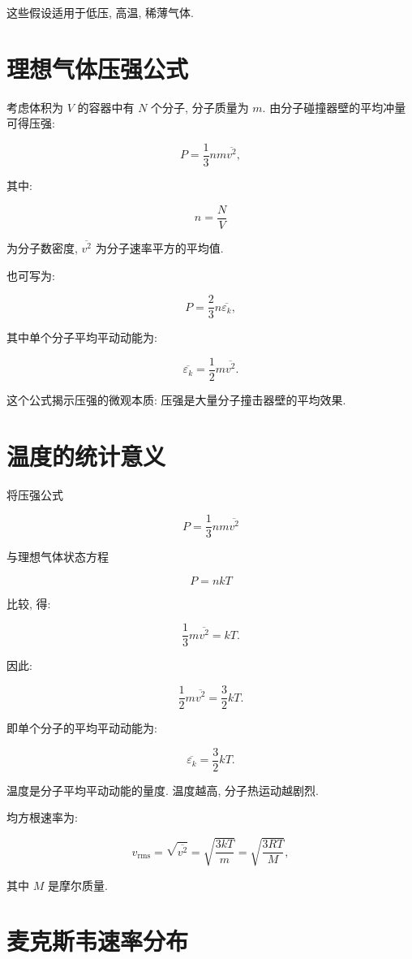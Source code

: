 \documentclass[
  a4paper,
]{ctexrep}
\begin{document}
这些假设适用于低压, 高温, 稀薄气体.

\section{理想气体压强公式}\label{ux7406ux60f3ux6c14ux4f53ux538bux5f3aux516cux5f0f}

考虑体积为 \(V\) 的容器中有 \(N\) 个分子, 分子质量为 \(m\).
由分子碰撞器壁的平均冲量可得压强:

\[
P=\frac{1}{3}nm\overline{v^2},
\]

其中:

\[
n=\frac{N}{V}
\]

为分子数密度, \(\overline{v^2}\) 为分子速率平方的平均值.

也可写为:

\[
P=\frac{2}{3}n\overline{\varepsilon_k},
\]

其中单个分子平均平动动能为:

\[
\overline{\varepsilon_k}=\frac{1}{2}m\overline{v^2}.
\]

这个公式揭示压强的微观本质: 压强是大量分子撞击器壁的平均效果.

\section{温度的统计意义}\label{ux6e29ux5ea6ux7684ux7edfux8ba1ux610fux4e49}

将压强公式

\[
P=\frac{1}{3}nm\overline{v^2}
\]

与理想气体状态方程

\[
P=nkT
\]

比较, 得:

\[
\frac{1}{3}m\overline{v^2}=kT.
\]

因此:

\[
\frac{1}{2}m\overline{v^2}=\frac{3}{2}kT.
\]

即单个分子的平均平动动能为:

\[
\overline{\varepsilon_k}=\frac{3}{2}kT.
\]

温度是分子平均平动动能的量度. 温度越高, 分子热运动越剧烈.

均方根速率为:

\[
v_{\mathrm{rms}}=\sqrt{\overline{v^2}}=\sqrt{\frac{3kT}{m}}=\sqrt{\frac{3RT}{M}},
\]

其中 \(M\) 是摩尔质量.

\section{麦克斯韦速率分布}\label{ux9ea6ux514bux65afux97e6ux901fux7387ux5206ux5e03}
\end{document}
